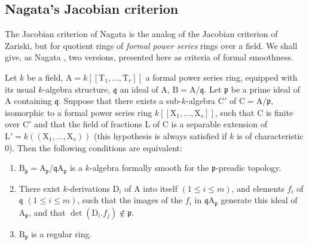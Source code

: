 \subsection{Nagata's Jacobian criterion}
\label{subsection:0.22.7}

\begin{env}[22.7.1]
\label{0.22.7.1}
The Jacobian criterion of Nagata is the analog of the Jacobian criterion of Zariski, but for quotient rings of \emph{formal power series} rings over a field.
We shall give, as Nagata \cite{IV-31}, two versions, presented here as criteria of formal smoothness.
\end{env}

\begin{proposition}[22.7.2]
\label{0.22.7.2}
Let $k$ be a field, $\mathrm{A}=k[[\mathrm{T}_1,\ldots,\mathrm{T}_r]]$ a formal power series ring, equipped with its usual $k$-algebra structure, $\mathfrak{q}$ an ideal of $\mathrm{A}$, $\mathrm{B}=\mathrm{A}/\mathfrak{q}$.
Let $\mathfrak{p}$ be a prime ideal of $\mathrm{A}$ containing $\mathfrak{q}$.
Suppose that there exists a sub-$k$-algebra $\mathrm{C}'$ of $\mathrm{C}=\mathrm{A}/\mathfrak{p}$, isomorphic to a formal power series ring $k[[\mathrm{X}_1,\ldots,\mathrm{X}_s]]$, such that $\mathrm{C}$ is finite over $\mathrm{C}'$ and that the field of fractions $\mathrm{L}$ of $\mathrm{C}$ is a separable extension of $\mathrm{L}'=k((\mathrm{X}_1,\ldots,\mathrm{X}_s))$ \textup{(this hypothesis is always satisfied if $k$ is of characteristic $0$)}.
Then the following conditions are equivalent:
\begin{enumerate}
  \item[\textup{a)}] $\mathrm{B}_\mathfrak{p}=\mathrm{A}_\mathfrak{p}/\mathfrak{q}\mathrm{A}_\mathfrak{p}$ is a $k$-algebra formally smooth for the $\mathfrak{p}$-preadic topology.
  \item[\textup{b)}] There exist $k$-derivations $\mathrm{D}_i$ of $\mathrm{A}$ into itself $(1\leq i\leq m)$, and elements $f_i$ of $\mathfrak{q}$ $(1\leq i\leq m)$, such that the images of the $f_i$ in $\mathfrak{q}\mathrm{A}_\mathfrak{p}$ generate this ideal of $\mathrm{A}_\mathfrak{p}$, and that $\det(\mathrm{D}_i.f_j)\notin\mathfrak{p}$.
  \item[\textup{c)}] $\mathrm{B}_\mathfrak{p}$ is a regular ring.
\end{enumerate}
\end{proposition}

